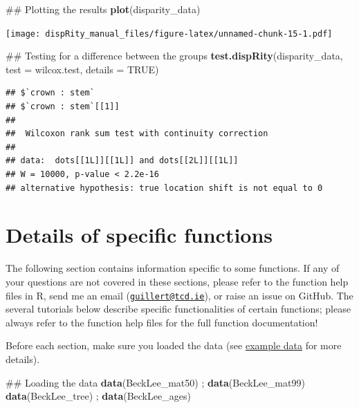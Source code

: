 \documentclass[]{book}
\newenvironment{Shaded}{\begin{snugshade}}{\end{snugshade}}
\newcommand{\KeywordTok}[1]{\textcolor[rgb]{0.13,0.29,0.53}{\textbf{#1}}}
\newcommand{\DataTypeTok}[1]{\textcolor[rgb]{0.13,0.29,0.53}{#1}}
\newcommand{\OtherTok}[1]{\textcolor[rgb]{0.56,0.35,0.01}{#1}}
\newcommand{\NormalTok}[1]{#1}
\theoremstyle{definition}
\theoremstyle{definition}
\theoremstyle{remark}
\begin{document}
\begin{Shaded}
\begin{Highlighting}[]
\NormalTok{## Plotting the results}
\KeywordTok{plot}\NormalTok{(disparity_data)}
\end{Highlighting}
\end{Shaded}

\texttt{[image: dispRity\_manual\_files/figure-latex/unnamed-chunk-15-1.pdf]}

\begin{Shaded}
\begin{Highlighting}[]
\NormalTok{## Testing for a difference between the groups}
\KeywordTok{test.dispRity}\NormalTok{(disparity_data, }\DataTypeTok{test =}\NormalTok{ wilcox.test, }\DataTypeTok{details =} \OtherTok{TRUE}\NormalTok{)}
\end{Highlighting}
\end{Shaded}

\begin{verbatim}
## $`crown : stem`
## $`crown : stem`[[1]]
## 
##  Wilcoxon rank sum test with continuity correction
## 
## data:  dots[[1L]][[1L]] and dots[[2L]][[1L]]
## W = 10000, p-value < 2.2e-16
## alternative hypothesis: true location shift is not equal to 0
\end{verbatim}

\chapter{Details of specific
functions}\label{details-of-specific-functions}

The following section contains information specific to some functions.
If any of your questions are not covered in these sections, please refer
to the function help files in R, send me an email
(\href{mailto:guillert@tcd.ie}{\nolinkurl{guillert@tcd.ie}}), or raise
an issue on GitHub. The several tutorials below describe specific
functionalities of certain functions; please always refer to the
function help files for the full function documentation!

Before each section, make sure you loaded the \citet{beckancient2014}
data (see \protect\hyperlink{example-data}{example data} for more
details).

\begin{Shaded}
\begin{Highlighting}[]
\NormalTok{## Loading the data}
\KeywordTok{data}\NormalTok{(BeckLee_mat50) ; }\KeywordTok{data}\NormalTok{(BeckLee_mat99)}
\KeywordTok{data}\NormalTok{(BeckLee_tree) ; }\KeywordTok{data}\NormalTok{(BeckLee_ages)}
\end{Highlighting}
\end{Shaded}
\end{document}
